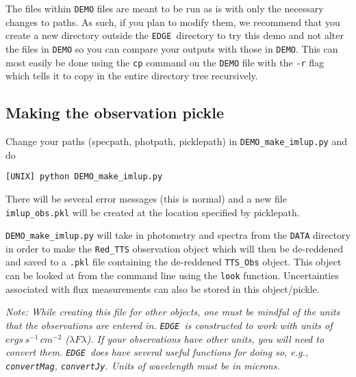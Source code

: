 \documentclass{article}
\newcommand{\edge}{\texttt{EDGE }}
\begin{document}
\noindent The files within \texttt{DEMO} files are meant to be run as is with only the necessary changes to paths. As such, if you plan to modify them, we recommend that you create a new directory outside the \edge directory to try this demo and not alter the files in \texttt{DEMO} so you can compare your outputs with those in \texttt{DEMO}.  This can most easily be done using the \texttt{cp} command on the \texttt{DEMO} file with the \texttt{-r} flag which tells it to copy in the entire directory tree recursively. %

\subsection{Making the observation pickle}

Change your paths (specpath, photpath, picklepath) in \texttt{DEMO\_make\_imlup.py} and do

\vspace{2mm}
\texttt{[UNIX] python DEMO\_make\_imlup.py}
\vspace{2mm}

\noindent There will be several error messages (this is normal) and a new file \texttt{imlup\_obs.pkl} will be created at the location specified by picklepath.
\vspace{2mm}

\noindent \texttt{DEMO\_make\_imlup.py} will take in photometry and spectra from the \texttt{DATA} directory in order to make the \texttt{Red\_TTS} observation object which will then be de-reddened and saved to a \texttt{.pkl} file containing the de-reddened \texttt{TTS\_Obs} object. This object can be looked at from the command line using the \texttt{look} function. Uncertainties associated with flux measurements can also be stored in this object/pickle.

\vspace{2mm}

\noindent \textit{Note: While creating this file for other objects, one must be mindful of the units that the observations are entered in. \edge is constructed to work with units of $ergs\,s^{-1}\,cm^{-2}$ ($\lambda F \lambda$). If your observations have other units, you will need to convert them. \edge does have several useful functions for doing so, e.g., \texttt{convertMag}, \texttt{convertJy}. Units of wavelength must be in microns.}
\end{document}
